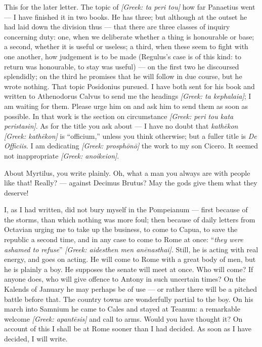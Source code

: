  This for the later letter. The topic of \textit{[Greek: ta peri tou]} how far Panaetius went --- I have finished it in two books. He has three; but although at the outset he had laid down the division thus --- that there are three classes of inquiry concerning duty: one, when we deliberate whether a thing is honourable or base; a second, whether it is useful or useless; a third, when these seem to fight with one another, how judgement is to be made (Regulus's case is of this kind: to return was honourable, to stay was useful) --- on the first two he discoursed splendidly; on the third he promises that he will follow in due course, but he wrote nothing. That topic Posidonius pursued. I have both sent for his book and written to Athenodorus Calvus to send me the headings \textit{[Greek: ta kephalaia]}; I am waiting for them. Please urge him on and ask him to send them as soon as possible. In that work is the section on circumstance \textit{[Greek: peri tou kata peristasin]}. As for the title you ask about --- I have no doubt that \textit{kathēkon} \textit{[Greek: kathēkon]} is ``officium,'' unless you think otherwise; but a fuller title is \textit{De Officiis}. I am dedicating \textit{[Greek: prosphōnō]} the work to my son Cicero. It seemed not inappropriate \textit{[Greek: anoikeion]}.

 About Myrtilus, you write plainly. Oh, what a man you always are with people like that! Really? --- against Decimus Brutus? May the gods give them what they deserve!

 I, as I had written, did not bury myself in the Pompeianum --- first because of the storms, than which nothing was more foul; then because of daily letters from Octavian urging me to take up the business, to come to Capua, to save the republic a second time, and in any case to come to Rome at once: ``\textit{they were ashamed to refuse}'' \textit{[Greek: aidesthen men anēnasthai]}. Still, he is acting with real energy, and goes on acting. He will come to Rome with a great body of men, but he is plainly a boy. He supposes the senate will meet at once. Who will come? If anyone does, who will give offence to Antony in such uncertain times? On the Kalends of January he may perhaps be of use --- or rather there will be a pitched battle before that. The country towns are wonderfully partial to the boy. On his march into Samnium he came to Cales and stayed at Teanum: a remarkable welcome \textit{[Greek: apantēsis]} and call to arms. Would you have thought it? On account of this I shall be at Rome sooner than I had decided. As soon as I have decided, I will write.

